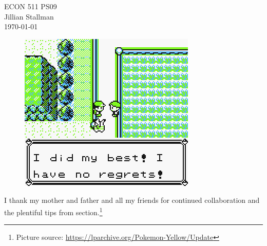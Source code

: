  \noindent
\begin{minipage}[t]{.6\textwidth}
\raggedright
	\Large ECON 511 PS09 \\
 	\large Jillian Stallman \\
 	\today \\[1.5em] %
\end{minipage}%
%
\hfill
\begin{minipage}[t]{.4\textwidth}
\vspace{-1em}
\raggedright 
\begin{figure}[H]
	\includegraphics[width=.3\linewidth]{figures/did-best-no-regrets.png}
\end{figure}
\end{minipage}
 
 \vspace{1em} 
 I thank my mother and father and all my friends for continued collaboration and the plentiful tips from section.\footnote{Picture source: \url{https://lparchive.org/Pokemon-Yellow/Update}}
 